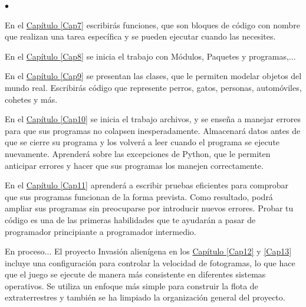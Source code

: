 \begin{list}{$\bullet$}{}
	
	
	
	\item  En el \hyperlink{Cap7}{Capítulo \ref{Cap7}} escribirás funciones, que son bloques de código con nombre que realizan una tarea específica y se pueden ejecutar cuando las necesites.


   \item  En el \hyperlink{Cap8}{Capítulo \ref{Cap8}}  se inicia el trabajo con Módulos, Paquetes y programas,...

 
   \item  En el \hyperlink{Cap9}{Capítulo \ref{Cap9}} se presentan las clases, que le permiten modelar objetos del mundo real. Escribirás código que represente perros, gatos, personas, automóviles, cohetes y más.



  \item  En el \hyperlink{Cap10}{Capítulo \ref{Cap10}}  se inicia el trabajo archivos,  y se enseña a  manejar errores para que sus programas no colapsen inesperadamente. Almacenará datos antes de que se cierre su programa y los volverá a leer cuando el programa se ejecute nuevamente. 
Aprenderá sobre las excepciones de Python, que le permiten anticipar errores y hacer que sus programas los manejen correctamente.


	
	\item  En el \hyperlink{Cap11}{Capítulo \ref{Cap11}} aprenderá a escribir pruebas eficientes para comprobar que sus programas funcionan de la forma prevista. Como resultado, podrá ampliar sus programas sin preocuparse por introducir nuevos errores. Probar tu código es una de las primeras habilidades que te ayudarán a pasar de programador principiante a programador intermedio.
	
	
	
	\item  En proceso... El proyecto Invasión  alienígena en los \hyperlink{Cap12}{Capítulo \ref{Cap12}} y \ref{Cap13} incluye una configuración para controlar la velocidad  de fotogramas, lo que hace que el juego se ejecute de manera más consistente en diferentes sistemas operativos. Se utiliza un enfoque más simple para construir la flota de extraterrestres y también se ha limpiado la organización general del proyecto.


\end{list}
